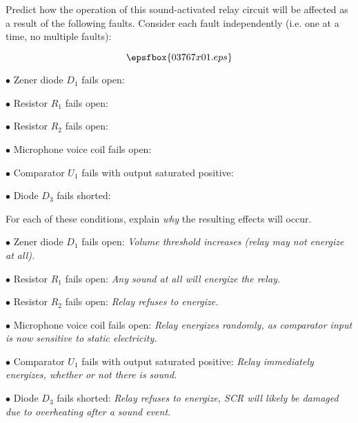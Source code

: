 

Predict how the operation of this sound-activated relay circuit will be affected as a result of the following faults.  Consider each fault independently (i.e. one at a time, no multiple faults):

$$\epsfbox{03767x01.eps}$$

\medskip
\item{$\bullet$} Zener diode $D_1$ fails open:
\vskip 5pt
\item{$\bullet$} Resistor $R_1$ fails open:
\vskip 5pt
\item{$\bullet$} Resistor $R_2$ fails open:
\vskip 5pt
\item{$\bullet$} Microphone voice coil fails open:
\vskip 5pt
\item{$\bullet$} Comparator $U_1$ fails with output saturated positive:
\vskip 5pt
\item{$\bullet$} Diode $D_3$ fails shorted:
\medskip

For each of these conditions, explain {\it why} the resulting effects will occur.







\medskip
\item{$\bullet$} Zener diode $D_1$ fails open: {\it Volume threshold increases (relay may not energize at all).}
\vskip 5pt
\item{$\bullet$} Resistor $R_1$ fails open: {\it Any sound at all will energize the relay.}
\vskip 5pt
\item{$\bullet$} Resistor $R_2$ fails open: {\it Relay refuses to energize.}
\vskip 5pt
\item{$\bullet$} Microphone voice coil fails open: {\it Relay energizes randomly, as comparator input is now sensitive to static electricity.}
\vskip 5pt
\item{$\bullet$} Comparator $U_1$ fails with output saturated positive: {\it Relay immediately energizes, whether or not there is sound.}
\vskip 5pt
\item{$\bullet$} Diode $D_3$ fails shorted: {\it Relay refuses to energize, SCR will likely be damaged due to overheating after a sound event.}
\medskip

